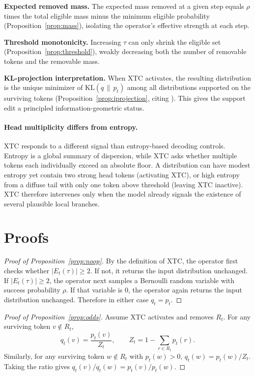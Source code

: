 \documentclass{article}
\newcommand{\xtc}{\textsc{XTC}}
\newcommand{\pt}{p_t}
\newcommand{\qt}{q_t}
\newcommand{\Et}{E_t(\tau)}
\newcommand{\Rt}{R_t}
\begin{document}
\textbf{Expected removed mass.}
The expected mass removed at a given step equals $\rho$ times the total eligible mass minus the minimum eligible probability (Proposition~\ref{prop:mass}), isolating the operator's effective strength at each step.

\textbf{Threshold monotonicity.}
Increasing $\tau$ can only shrink the eligible set (Proposition~\ref{prop:threshold}), weakly decreasing both the number of removable tokens and the removable mass.

\textbf{KL-projection interpretation.}
When \xtc{} activates, the resulting distribution is the unique minimizer of $\mathrm{KL}(q \,\|\, \pt)$ among all distributions supported on the surviving tokens (Proposition~\ref{prop:iprojection}, citing \citet{csiszar1975divergence, cover2006elements, shannon1948mathematical}).
This gives the support edit a principled information-geometric status.

\paragraph{Head multiplicity differs from entropy.}
\xtc{} responds to a different signal than entropy-based decoding controls.
Entropy is a global summary of dispersion, while \xtc{} asks whether multiple tokens each individually exceed an absolute floor.
A distribution can have modest entropy yet contain two strong head tokens (activating \xtc{}), or high entropy from a diffuse tail with only one token above threshold (leaving \xtc{} inactive).
\xtc{} therefore intervenes only when the model already signals the existence of several plausible local branches.
\FloatBarrier

\section{Proofs}
\label{app:proofs}

\begin{proof}[Proof of Proposition~\ref{prop:noop}]
By the definition of \xtc{}, the operator first checks whether $|\Et| \ge 2$.
If not, it returns the input distribution unchanged.
If $|\Et| \ge 2$, the operator next samples a Bernoulli random variable with success probability $\rho$.
If that variable is $0$, the operator again returns the input distribution unchanged.
Therefore in either case $\qt = \pt$.
\end{proof}

\begin{proof}[Proof of Proposition~\ref{prop:odds}]
Assume \xtc{} activates and removes $\Rt$.
For any surviving token $v \notin \Rt$,
\[
\qt(v) = \frac{\pt(v)}{Z_t},
\qquad
Z_t = 1 - \sum_{r \in \Rt}\pt(r).
\]
Similarly, for any surviving token $w \notin \Rt$ with $\pt(w) > 0$, $\qt(w) = \pt(w)/Z_t$.
Taking the ratio gives $\qt(v)/\qt(w) = \pt(v)/\pt(w)$.
\end{proof}
\end{document}
